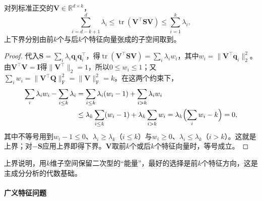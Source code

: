 \begin{theorem}[迹极值]
\label{thm:matrix-analysis-trace-minimum}
对列标准正交的$\bm V\in\mathbb R^{d\times k}$，
\begin{equation}
 \sum_{i=d-k+1}^{d}\lambda_i\leq\operatorname{tr}(\bm V^\top\bm S\bm V)\leq\sum_{i=1}^{k}\lambda_i,
 \label{eq:matrix-analysis-trace-minimum}
\end{equation}
上下界分别由前$k$个与后$k$个特征向量张成的子空间取到。
\end{theorem}
\begin{proof}
代入$\bm S=\sum_i\lambda_i\bm q_i\bm q_i^\top$，得$\operatorname{tr}(\bm V^\top\bm S\bm V)=\sum_i\lambda_iw_i$，其中$w_i=\lVert\bm V^\top\bm q_i\rVert_2^2$。由$\bm V^\top\bm V=\bm I$得$\lVert\bm V^\top\rVert_2=1$，所以$0\leq w_i\leq1$；又$\sum_iw_i=\lVert\bm V^\top\bm Q\rVert_{\mathrm F}^2=\lVert\bm V\rVert_{\mathrm F}^2=k$。在这两个约束下，
\[
 \begin{aligned}
 \sum_i\lambda_iw_i-\sum_{i\leq k}\lambda_i
 &=\sum_{i\leq k}\lambda_i(w_i-1)+\sum_{i>k}\lambda_iw_i\\
 &\leq\lambda_k\sum_{i\leq k}(w_i-1)+\lambda_k\sum_{i>k}w_i
 =\lambda_k\Bigl(\sum_iw_i-k\Bigr)=0,
 \end{aligned}
\]
其中不等号用到$w_i-1\leq0$、$\lambda_i\geq\lambda_k$（$i\leq k$）与$w_i\geq0$、$\lambda_i\leq\lambda_k$（$i>k$）。这就是上界；对$-\bm S$应用上界即得下界。$\bm V$取前$k$个或后$k$个特征向量时，等号成立。
\end{proof}
上界说明，用$k$维子空间保留二次型的“能量”，最好的选择是前$k$个特征方向，这是主成分分析的代数基础。

\paragraph{广义特征问题}

